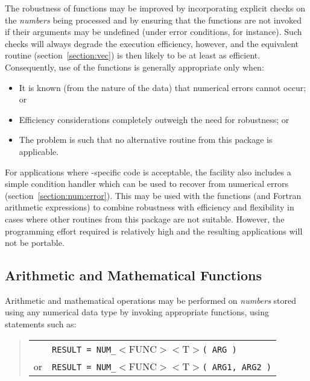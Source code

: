 The robustness of  functions may be improved by incorporating
explicit checks on the {\em numbers} being processed and by ensuring that
the functions are not invoked if their arguments may be undefined (under
error conditions, for instance).
Such checks will always degrade the execution efficiency, however, and the
equivalent  routine (section~\ref{section:vec}) is then likely
to be at least as efficient.
Consequently, use of the  functions is generally appropriate
only when:

\begin{itemize}

\item It is known (from the nature of the data) that numerical errors cannot
occur; or

\item Efficiency considerations completely outweigh the need for robustness;
or

\item The problem is such that no alternative routine from this package
is applicable.

\end{itemize}

For applications where -specific code is acceptable, the
 facility also includes a simple  condition handler
which can be used to recover from numerical errors
(section~\ref{section:num:error}).
This may be used with the  functions (and Fortran arithmetic
expressions) to combine robustness with efficiency and flexibility in cases
where other routines from this package are not suitable.
However, the programming effort required is relatively high and the
resulting applications will not be portable.

\subsection{ Arithmetic and Mathematical Functions}

Arithmetic and mathematical operations may be performed on {\em numbers}
stored using any numerical data type by invoking appropriate 
functions, using statements such as:

\begin{quote}
\begin{tabular}{ll}
   & \verb#RESULT = NUM_#$<$FUNC$><$T$>$\verb#( ARG )#\\
or & \verb#RESULT = NUM_#$<$FUNC$><$T$>$\verb#( ARG1, ARG2 )#
\end{tabular}
\end{quote}

